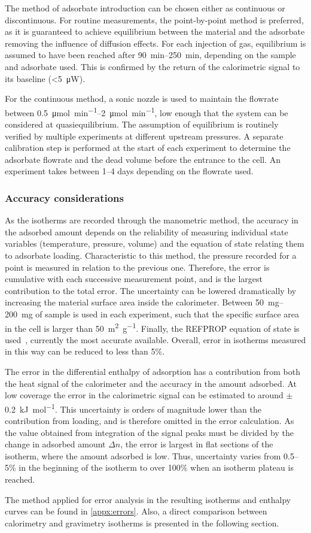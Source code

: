 The method of adsorbate introduction can be chosen either as
continuous or discontinuous. For routine measurements,
the point-by-point method is preferred, as it is guaranteed
to achieve equilibrium between the material and the adsorbate
removing the influence of diffusion effects.
For each injection of gas, equilibrium is assumed to have
been reached after \SIrange{90}{250}{\minute}, depending on the
sample and adsorbate used. This is confirmed by the return
of the calorimetric signal to its baseline (<\SI{5}{\micro\watt}).

For the continuous method, a sonic nozzle is used to 
maintain the flowrate between \SIrange{0.5}{2}{\micro\mol\per\minute},
low enough that the system can be considered at quasiequilibrium.
The assumption of equilibrium is routinely verified by multiple
experiments at different upstream pressures.
A separate calibration step is performed at the start of each
experiment to determine the adsorbate flowrate and the dead volume
before the entrance to the cell. An experiment takes between 1--4 
days depending on the flowrate used. 

\subsubsection{Accuracy considerations}\label{calo:accuracy}

As the isotherms are recorded through the manometric method,
the accuracy in the adsorbed amount depends on the reliability
of measuring individual state variables (temperature,
pressure, volume) and the equation of state relating them 
to adsorbate loading.
Characteristic to this method, the pressure recorded for 
a point is measured in relation to the previous one. Therefore,
the error is cumulative with each successive measurement point,
and is the largest contribution to the total error. The 
uncertainty can be lowered dramatically by increasing 
the material surface area inside the calorimeter.
Between \SIrange{50}{200}{\milli\gram}
of sample is used in each experiment, such that the specific
surface area in the cell is larger than
\SI{50}{\metre^2\per\gram}. Finally, the REFPROP equation
of state is used~\cite{lemmonNISTReferenceFluid1989}, 
currently the most accurate available.
Overall, error in isotherms measured in this way can be 
reduced to less than 5\%.

The error in the differential enthalpy of adsorption has a
contribution from both the heat signal of the calorimeter 
and the accuracy in the amount adsorbed.
At low coverage the error in the calorimetric signal can be
estimated to around \( \pm \) \SI{0.2} {\kilo\joule\per\mol}.
This uncertainty is orders of magnitude lower than the contribution
from loading, and is therefore omitted in the error calculation.
As the value obtained from integration of the signal peaks
must be divided by the change in adsorbed amount \(\Delta n\),
the error is largest in flat sections of the isotherm, where 
the amount adsorbed is low. Thus, uncertainty varies from 
0.5--5\% in the beginning of the isotherm to over 100\% when
an isotherm plateau is reached.

The method applied for error analysis in the resulting isotherms and
enthalpy curves can be found in \autoref{appx:errors}. 
Also, a direct comparison
between calorimetry and gravimetry isotherms is presented in the 
following section.